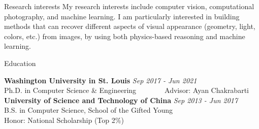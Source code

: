 \documentclass{resume} %
\begin{document}

\begin{rSection}{Research interests}
My research interests include computer vision, computational photography, and machine learning. I am particularly interested in building methods that can recover different aspects of visual appearance (geometry, light, colors, etc.) from images, by using both physics-based reasoning and machine learning.

\end{rSection}


\begin{rSection}{Education}

{\bf Washington University in St. Louis} \hfill {\em Sep 2017 - Jun 2021} \\
Ph.D. in Computer Science \& Engineering~~~~~~~~Advisor: Ayan Chakrabarti \\

{\bf University of Science and Technology of China} \hfill {\em Sep 2013 - Jun 2017} \\
B.S. in Computer Science, School of the Gifted Young \\
Honor: National Scholarship (Top 2\%)

\end{rSection}
\end{document}
